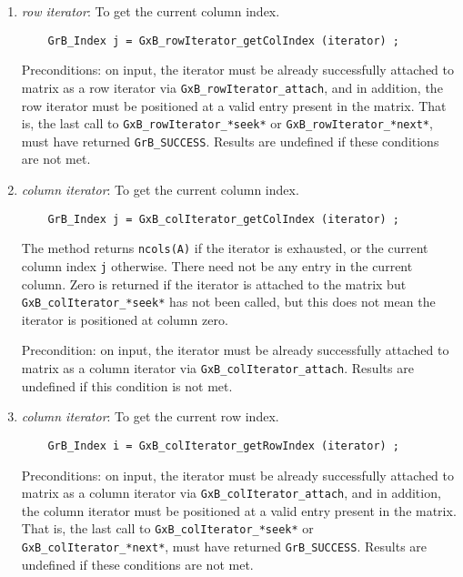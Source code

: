 \documentclass[12pt]{article}
\begin{document}
{\begin{enumerate}
    Preconditions: on input, the iterator must be already successfully attached
    to matrix as a row iterator via \verb'GxB_rowIterator_attach'.
    Results are undefined if this condition is not met.

    \item {\em row iterator}:  To get the current column index.
    {\footnotesize
    \begin{verbatim}
    GrB_Index j = GxB_rowIterator_getColIndex (iterator) ; \end{verbatim}}

    Preconditions: on input, the iterator must be already successfully attached
    to matrix as a row iterator via \verb'GxB_rowIterator_attach', and in
    addition, the row iterator must be positioned at a valid entry present in
    the matrix.  That is, the last call to \verb'GxB_rowIterator_*seek*' or
    \verb'GxB_rowIterator_*next*', must have returned \verb'GrB_SUCCESS'.
    Results are undefined if these conditions are not met.

    \item {\em column iterator}:  To get the current column index.
    {\footnotesize
    \begin{verbatim}
    GrB_Index j = GxB_colIterator_getColIndex (iterator) ; \end{verbatim}}

    The method returns \verb'ncols(A)' if the iterator is exhausted, or the
    current column index \verb'j' otherwise.  There need not be any entry in the
    current column.  Zero is returned if the iterator is attached to the matrix
    but \verb'GxB_colIterator_*seek*' has not been called, but this does not
    mean the iterator is positioned at column zero.

    Precondition: on input, the iterator must be already successfully attached
    to matrix as a column iterator via \verb'GxB_colIterator_attach'.
    Results are undefined if this condition is not met.

    \item {\em column iterator}:  To get the current row index.
    {\footnotesize
    \begin{verbatim}
    GrB_Index i = GxB_colIterator_getRowIndex (iterator) ; \end{verbatim}}

    Preconditions: on input, the iterator must be already successfully attached
    to matrix as a column iterator via \verb'GxB_colIterator_attach', and in
    addition, the column iterator must be positioned at a valid entry present in
    the matrix.  That is, the last call to \verb'GxB_colIterator_*seek*' or
    \verb'GxB_colIterator_*next*', must have returned \verb'GrB_SUCCESS'.
    Results are undefined if these conditions are not met.


\end{enumerate}}
\end{document}
